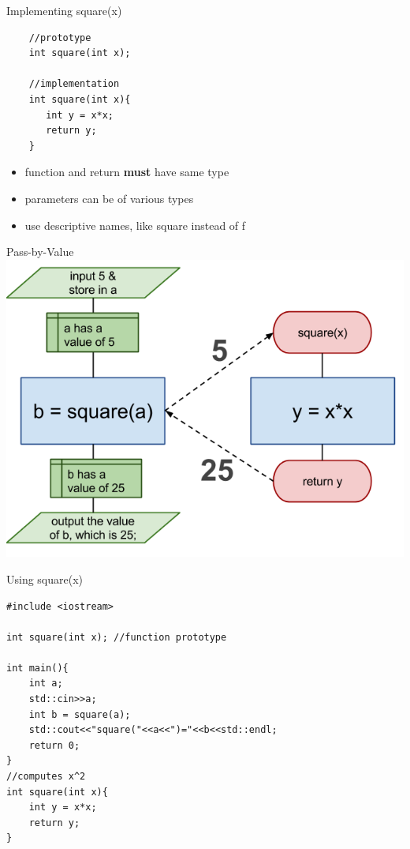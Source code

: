 \documentclass[xcolor={dvipsnames}]{beamer}
\begin{document}
\begin{frame}[fragile]{Implementing square(x)}
	\begin{center}
	 
	\begin{verbatim}
	//prototype
	int square(int x);

	//implementation
	int square(int x){
	   int y = x*x;
	   return y;
	}   
	\end{verbatim}
	\end{center}
	\begin{center}
		\begin{itemize}
			\item function and return \textbf{must} have same type
			\item parameters can be of various types
			\item use descriptive names, like square instead of f
		\end{itemize}
	\end{center}
\end{frame}

\begin{frame}{ Pass-by-Value}
	\includegraphics[width=1\textwidth]{fsq_pbv}
\end{frame}

\begin{frame}[fragile]{Using square(x)}
	\begin{verbatim}
#include <iostream>

int square(int x); //function prototype

int main(){
    int a;
    std::cin>>a;
    int b = square(a);
    std::cout<<"square("<<a<<")="<<b<<std::endl;
    return 0;
}
//computes x^2
int square(int x){
    int y = x*x;
    return y;
}   
	\end{verbatim}
\end{frame}
\end{document}
